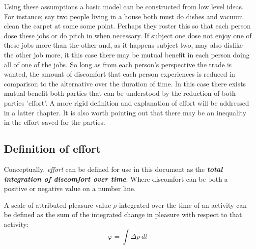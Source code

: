 \documentclass[]{article}
\begin{document}
Using these assumptions a basic model can be constructed from low level ideas. For instance; say two people living in a house both must do dishes and vacuum clean the carpet at some some point. Perhaps they roster this so that each person dose these jobs or do pitch in when necessary. If subject one dose not enjoy one of these jobs more than the other and, as it happens subject two, may also dislike the other job more, it this case there may be mutual benefit in each person doing all of one of the jobs. So long as from each person's perspective the trade is wanted, the amount of discomfort that each person experiences is reduced in comparison to the alternative over the duration of time. In this case there exists mutual benefit both parties that can be understood by the reduction of both parties 'effort'. A more rigid definition and explanation of effort will be addressed in a latter chapter. It is also worth pointing out that there may be an inequality in the effort saved for the parties. 


\subsection{Definition of effort}

Conceptually, \textit{effort} can be defined for use in this document as the \textit{\textbf{total integration of discomfort over time}}. Where discomfort can be both a positive or negative value on a number line.

\begin{figure}[!h]
	\centering
\end{figure}


A scale of attributed pleasure value $\rho$ integrated over the time of an activity can be defined as the sum of the integrated change in pleasure with respect to that activity:
\begin{equation}\label{phidef}
	\varphi = \int{ \Delta \rho  \:  dt }
\end{equation}
\end{document}
